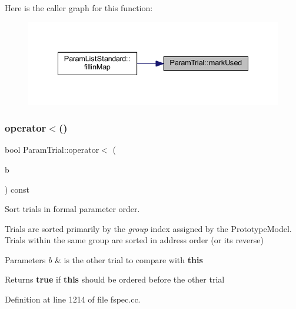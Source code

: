 Here is the caller graph for this function\+:
\nopagebreak
\begin{figure}[H]
\begin{center}
\leavevmode
\includegraphics[width=335pt]{class_param_trial_aa4ffa0c04adb864a3cfcff61f5b75051_icgraph}
\end{center}
\end{figure}
\mbox{\label{class_param_trial_ac234b0e0b800d4319bc212dd2eb088d8}} 
\subsubsection{\texorpdfstring{operator$<$()}{operator<()}}
{\footnotesize\ttfamily bool Param\+Trial\+::operator$<$ (\begin{DoxyParamCaption}\item[{const \mbox{\hyperlink{class_param_trial}{Param\+Trial}} \&}]{b }\end{DoxyParamCaption}) const}



Sort trials in formal parameter order. 

Trials are sorted primarily by the {\itshape group} index assigned by the Prototype\+Model. Trials within the same group are sorted in address order (or its reverse) 
\begin{DoxyParams}{Parameters}
{\em b} & is the other trial to compare with {\bfseries{this}} \\
\hline
\end{DoxyParams}
\begin{DoxyReturn}{Returns}
{\bfseries{true}} if {\bfseries{this}} should be ordered before the other trial 
\end{DoxyReturn}


Definition at line 1214 of file fspec.\+cc.

